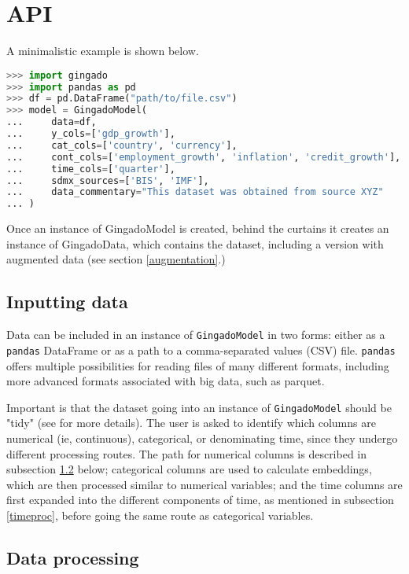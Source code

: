 \documentclass{article}
\begin{document}
\section{API}
A minimalistic example is shown below.

\begin{lstlisting}[language=Python, caption = API example, label=API]
>>> import gingado
>>> import pandas as pd
>>> df = pd.DataFrame("path/to/file.csv")
>>> model = GingadoModel(
...     data=df,
...     y_cols=['gdp_growth'],
...     cat_cols=['country', 'currency'],
...     cont_cols=['employment_growth', 'inflation', 'credit_growth'],
...     time_cols=['quarter'],
...     sdmx_sources=['BIS', 'IMF'],
...     data_commentary="This dataset was obtained from source XYZ"
... )
\end{lstlisting}

Once an instance of GingadoModel is created, behind the curtains it creates an instance of GingadoData, which contains the dataset, including a version with augmented data (see section \ref{augmentation}.)

\subsection{Inputting data}

Data can be included in an instance of \texttt{GingadoModel} in two forms: either as a \texttt{pandas} DataFrame or as a path to a comma-separated values (CSV) file. \texttt{pandas} offers multiple possibilities for reading files of many different formats, including more advanced formats associated with big data, such as parquet.

Important is that the dataset going into an instance of \texttt{GingadoModel} should be "tidy" (see \cite{TidyData} for more details). The user is asked to identify which columns are numerical (ie, continuous), categorical, or denominating time, since they undergo different processing routes. The path for numerical columns is described in subsection \ref{dataproc} below; categorical columns are used to calculate embeddings, which are then processed similar to numerical variables; and the time columns are first expanded into the different components of time, as mentioned in subsection \ref{timeproc}, before going the same route as categorical variables.


\subsection{Data processing}\label{dataproc}
\end{document}
